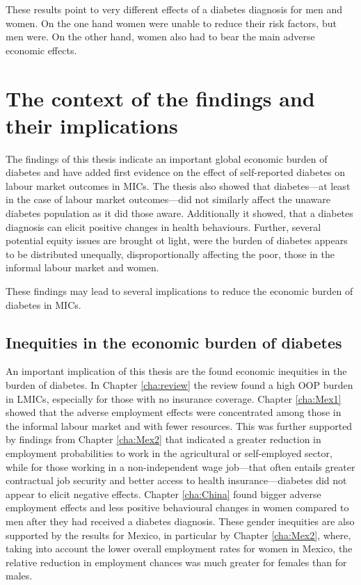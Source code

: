 These results point to very different effects of a diabetes diagnosis for men and women. On the one hand women were unable to reduce their risk factors, but men were. On the other hand, women also had to bear the main adverse economic effects. 

\section{The context of the findings and their implications}

The findings of this thesis indicate an important global economic burden of diabetes and have added first evidence on the effect of self-reported diabetes on labour market outcomes in \acp{MIC}. The thesis also showed that diabetes---at least in the case of labour market outcomes---did not similarly affect the unaware diabetes population as it did those aware. Additionally it showed, that a diabetes diagnosis can elicit positive changes in health behaviours. Further, several potential equity issues are brought ot light, were the burden of diabetes appears to be distributed unequally, disproportionally affecting the poor, those in the informal labour market and women.

These findings may lead to several implications to reduce the economic burden of diabetes in \acp{MIC}. 

\subsection*{Inequities in the economic burden of diabetes}

An important implication of this thesis are the found economic inequities in the burden of diabetes. In Chapter \ref{cha:review} the review found a high \ac{OOP} burden in \acp{LMIC}, especially for those with no insurance coverage. Chapter \ref{cha:Mex1} showed that the adverse employment effects were concentrated among those in the informal labour market and with fewer resources. This was further supported by findings from Chapter \ref{cha:Mex2} that indicated a greater reduction in employment probabilities to work in the agricultural or self-employed sector, while for those working in a non-independent wage job---that often entails greater contractual job security and better access to health insurance---diabetes did not appear to elicit negative effects. Chapter \ref{cha:China} found bigger adverse employment effects and less positive behavioural changes in women compared to men after they had received a diabetes diagnosis. These gender inequities are also supported by the results for Mexico, in particular by Chapter \ref{cha:Mex2}, where, taking into account the lower overall employment rates for women in Mexico, the relative reduction in employment chances was much greater for females than for males.

